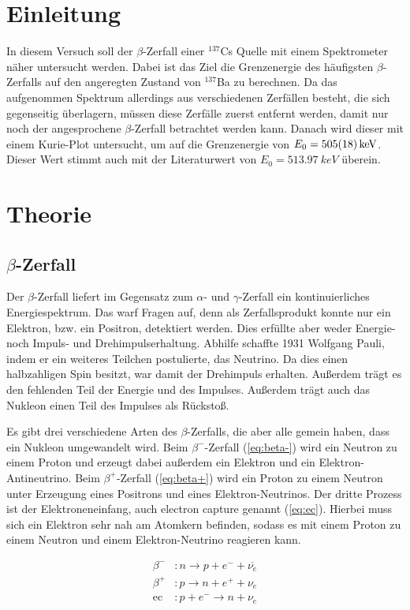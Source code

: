 \setlength{\multlinegap}{0pt}
\section{Einleitung}
In diesem Versuch soll der $\beta$-Zerfall einer $^{137}$Cs Quelle mit einem Spektrometer näher untersucht werden. Dabei ist das Ziel die Grenzenergie des häufigsten $\beta$-Zerfalls auf den angeregten Zustand von $^{137}$Ba zu berechnen. Da das aufgenommen Spektrum allerdings aus verschiedenen Zerfällen besteht, die sich gegenseitig überlagern, müssen diese Zerfälle zuerst entfernt werden, damit nur noch der angesprochene $\beta$-Zerfall betrachtet werden kann. Danach wird dieser mit einem Kurie-Plot untersucht, um auf die Grenzenergie von $E_{0} = \SI{505 \pm 18}{keV}$. Dieser Wert stimmt auch mit der Literaturwert von $E_{0} =\SI{513,97}{keV}$ \autocite{Zerfallsreihe} überein.
\section{Theorie}
\subsection{$\beta$-Zerfall}
Der $\beta$-Zerfall liefert im Gegensatz zum $\alpha$- und $\gamma$-Zerfall ein kontinuierliches Energiespektrum. Das warf Fragen auf, denn als Zerfallsprodukt konnte nur ein Elektron, bzw. ein Positron, detektiert werden. Dies erfüllte aber weder Energie- noch Impuls- und Drehimpulserhaltung. Abhilfe schaffte 1931 Wolfgang Pauli, indem er ein weiteres Teilchen postulierte, das Neutrino. Da dies einen halbzahligen Spin besitzt, war damit der Drehimpuls erhalten. Außerdem trägt es den fehlenden Teil der Energie und des Impulses. Außerdem trägt auch das Nukleon einen Teil des Impulses als Rückstoß.

Es gibt drei verschiedene Arten des $\beta$-Zerfalls, die aber alle gemein haben, dass ein Nukleon umgewandelt wird. Beim $\beta^-$-Zerfall (\cref{eq:beta-}) wird ein Neutron zu einem Proton und erzeugt dabei außerdem ein Elektron und ein Elektron-Antineutrino. Beim $\beta^+$-Zerfall (\cref{eq:beta+}) wird ein Proton zu einem Neutron unter Erzeugung eines Positrons und eines Elektron-Neutrinos. Der dritte Prozess ist der Elektroneneinfang, auch electron capture genannt (\cref{eq:ec}). Hierbei muss sich ein Elektron sehr nah am Atomkern befinden, sodass es mit einem Proton zu einem Neutron und einem Elektron-Neutrino reagieren kann.

\begin{align}
	\beta^-&:	 n \rightarrow p + e^- + \overline{\nu_e} \label{eq:beta-} \\
	\beta^+&:	 p \rightarrow n + e^+ + \nu_e \label{eq:beta+} \\
	\text{ec}&: p + e^- \rightarrow n + \nu_e \label{eq:ec}
\end{align}

